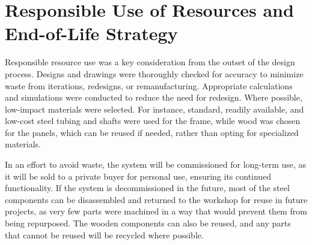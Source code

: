 \chapter{Responsible Use of Resources and End-of-Life Strategy}

Responsible resource use was a key consideration from the outset of the design process. Designs and drawings were thoroughly checked for accuracy to minimize waste from iterations, redesigns, or remanufacturing. Appropriate calculations and simulations were conducted to reduce the need for redesign. Where possible, low-impact materials were selected. For instance, standard, readily available, and low-cost steel tubing and shafts were used for the frame, while wood was chosen for the panels, which can be reused if needed, rather than opting for specialized materials.

In an effort to avoid waste, the system will be commissioned for long-term use, as it will be sold to a private buyer for personal use, ensuring its continued functionality. If the system is decommissioned in the future, most of the steel components can be disassembled and returned to the workshop for reuse in future projects, as very few parts were machined in a way that would prevent them from being repurposed. The wooden components can also be reused, and any parts that cannot be reused will be recycled where possible.
